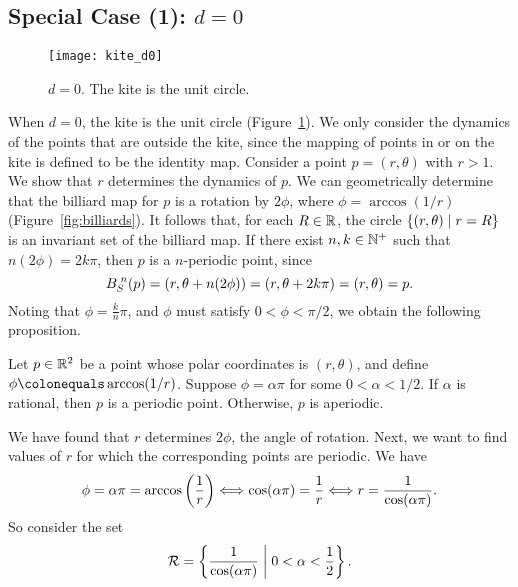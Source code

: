 \documentclass[10pt,twoside]{book}
\begin{document}
\subsection*{Special Case (1): $d = 0$}
\begin{figure}[ht]
  \begin{center}
    \texttt{[image: kite\_d0]}
    \caption{$d = 0$. The kite is the unit circle.}
    \label{fig:kite-circle}
  \end{center}
\end{figure}
When $d = 0$, the kite is the unit circle (Figure~\ref{fig:kite-circle}).
We only consider the dynamics of the points that are outside the kite, since the mapping of points in or on the kite is defined to be the identity map.
Consider a point $p = (r, \theta)$ with $r > 1$.
We show that $r$ determines the dynamics of $p$.
We can geometrically determine that the billiard map for $p$ is a rotation by $2\phi$, where $\phi = \arccos(1/r)$ (Figure~\ref{fig:billiards}).
It follows that, for each $R \in \mathbb{R}$, the circle $\left \{ (r,\theta) \mathrel{} \middle| \mathrel{} r = R \right \}$ is an invariant set of the billiard map.
If there exist $n, k \in \mathbb{N}^+$ such that $n(2\phi) = 2k\pi$, then $p$ is a $n$-periodic point, since 
\begin{equation*}
  B_S^{\;n}(p) = (r, \theta + n(2\phi)) = (r, \theta + 2k\pi) = (r, \theta) = p.
\end{equation*}
Noting that $\phi = \frac{k}{n}\pi$, and $\phi$ must satisfy $0 < \phi < \pi/2$, we obtain the following proposition.
\begin{proposition}
  Let $p \in \mathbb{R}^2$ be a point whose polar coordinates is $(r,\theta)$, and define $\phi \ceq \arccos(1/r)$.
  Suppose $\phi = \alpha\pi$ for some $0 < \alpha < 1/2$.
  If $\alpha$ is rational, then $p$ is a periodic point.
  Otherwise, $p$ is aperiodic.
\end{proposition}
We have found that $r$ determines $2\phi$, the angle of rotation.
Next, we want to find values of $r$ for which the corresponding points are periodic.
We have
\begin{equation*}
  \phi = \alpha\pi = \arccos\left (  \frac{1}{r}  \right ) 
  \Longleftrightarrow \cos(\alpha\pi) = \frac{1}{r}
  \Longleftrightarrow r = \frac{1}{\cos(\alpha\pi)}.
\end{equation*}
So consider the set
\begin{equation*}
  \mathcal{R} = \left \{ \frac{1}{\cos(\alpha\pi)} \mathrel{} \middle| \mathrel{} 0 < \alpha < \frac{1}{2} \right \}.
\end{equation*}
\end{document}
